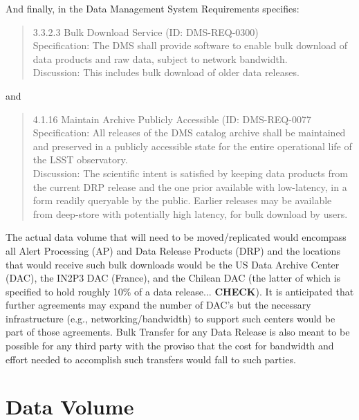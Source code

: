 And finally, in the Data Management System Requirements  specifies:
\begin{quote}
3.3.2.3 Bulk Download Service (ID: DMS-REQ-0300)\\
Specification: The DMS shall provide software to enable bulk download of data products and raw data, subject to network bandwidth.\\
Discussion: This includes bulk download of older data releases.
\end{quote}

and 

\begin{quote}
4.1.16 Maintain Archive Publicly Accessible (ID: DMS-REQ-0077 \\
Specification: All releases of the DMS catalog archive shall be maintained and preserved in a publicly accessible state for the entire operational life of the LSST observatory.\\
Discussion: The scientific intent is satisfied by keeping data products from the current DRP release and the one prior available with low-latency, in a form readily queryable by the public. Earlier releases may be available from deep-store with potentially high latency, for bulk download by users.
\end{quote}

The actual data volume that will need to be moved/replicated would encompass all Alert Processing (AP) and Data Release Products (DRP) 
and the locations that would receive such bulk downloads would be the US Data Archive Center (DAC), the IN2P3 DAC (France), and the Chilean DAC 
(the latter of which is specified to hold roughly 10\% of a data release... {\bf CHECK}).  It is anticipated that further agreements may 
expand the number of DAC's but the necessary infrastructure (e.g., networking/bandwidth) to support such centers would be part of those agreements.
Bulk Transfer for any Data Release is also meant to be possible for any third party with the proviso that the cost for bandwidth and effort 
needed to accomplish such transfers would fall to such parties.


\section{Data Volume\label{sec_scale}}

